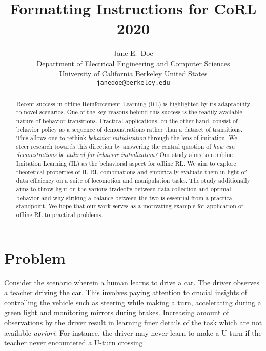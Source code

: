 \documentclass{article}
\title{Formatting Instructions for CoRL 2020}
\author{
  Jane E.~Doe\\
  Department of Electrical Engineering and Computer Sciences\\
  University of California Berkeley 
  United States\\
  \texttt{janedoe@berkeley.edu} \\
}
\begin{document}
\maketitle


\begin{abstract}
    Recent success in offline Reinforcement Learning (RL) is highlighted by its adaptability to novel scenarios. One of the key reasons behind this success is the readily available nature of behavior transitions. Practical applications, on the other hand, consist of behavior policy as a sequence of demonstrations rather than a dataset of transitions. This allows one to rethink \textit{behavior initialization} through the lens of imitation. We steer research towards this direction by answering the central question of \textit{how can demonstrations be utilized for behavior initialization?} Our study aims to combine Imitation Learning (IL) as the behavioral aspect for offline RL. We aim to explore theoretical properties of IL-RL combinations and empirically evaluate them in light of data efficiency on a suite of locomotion and manipulation tasks. The study additionally aims to throw light on the various tradeoffs between data collection and optimal behavior and why striking a balance between the two is essential from a practical standpoint. We hope that our work serves as a motivating example for application of offline RL to practical problems.
\end{abstract}



\section{Problem}

Consider the scenario wherein a human learns to drive a car. The driver observes a teacher driving the car. This involves paying attention to crucial insights of controlling the vehicle such as steering while making a turn, accelerating during a green light and monitoring mirrors during brakes. Increasing amount of observations by the driver result in learning finer details of the task which are not available \textit{apriori}. For instance, the driver may never learn to make a U-turn if the teacher never encountered a U-turn crossing. 
\end{document}
